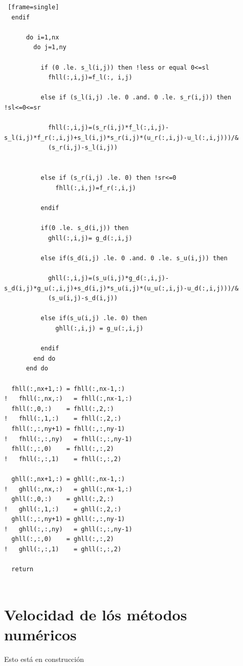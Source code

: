 \documentclass[12pt,a4paper]{book}
\begin{document}
\begin{lstlisting} [frame=single]
  endif

      do i=1,nx
        do j=1,ny
          
          if (0 .le. s_l(i,j)) then !less or equal 0<=sl
            fhll(:,i,j)=f_l(:, i,j)

          else if (s_l(i,j) .le. 0 .and. 0 .le. s_r(i,j)) then !sl<=0<=sr
        
            fhll(:,i,j)=(s_r(i,j)*f_l(:,i,j)-s_l(i,j)*f_r(:,i,j)+s_l(i,j)*s_r(i,j)*(u_r(:,i,j)-u_l(:,i,j)))/&
            (s_r(i,j)-s_l(i,j))

      
          else if (s_r(i,j) .le. 0) then !sr<=0
              fhll(:,i,j)=f_r(:,i,j)

          endif

          if(0 .le. s_d(i,j)) then
            ghll(:,i,j)= g_d(:,i,j)

          else if(s_d(i,j) .le. 0 .and. 0 .le. s_u(i,j)) then

            ghll(:,i,j)=(s_u(i,j)*g_d(:,i,j)-s_d(i,j)*g_u(:,i,j)+s_d(i,j)*s_u(i,j)*(u_u(:,i,j)-u_d(:,i,j)))/&
            (s_u(i,j)-s_d(i,j))

          else if(s_u(i,j) .le. 0) then
              ghll(:,i,j) = g_u(:,i,j)

          endif
        end do
      end do

  fhll(:,nx+1,:) = fhll(:,nx-1,:)
!   fhll(:,nx,:)   = fhll(:,nx-1,:)     
  fhll(:,0,:)    = fhll(:,2,:)
!   fhll(:,1,:)    = fhll(:,2,:)     
  fhll(:,:,ny+1) = fhll(:,:,ny-1)
!   fhll(:,:,ny)   = fhll(:,:,ny-1)
  fhll(:,:,0)    = fhll(:,:,2)
!   fhll(:,:,1)    = fhll(:,:,2)

  ghll(:,nx+1,:) = ghll(:,nx-1,:)
!   ghll(:,nx,:)   = ghll(:,nx-1,:)     
  ghll(:,0,:)    = ghll(:,2,:)
!   ghll(:,1,:)    = ghll(:,2,:)     
  ghll(:,:,ny+1) = ghll(:,:,ny-1)
!   ghll(:,:,ny)   = ghll(:,:,ny-1)
  ghll(:,:,0)    = ghll(:,:,2)
!   ghll(:,:,1)    = ghll(:,:,2)

  return


\end{lstlisting}

\chapter{Velocidad de lós métodos numéricos} \label{aped.D}

Esto está en construcción
\end{document}
